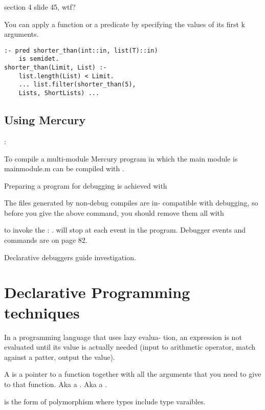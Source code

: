 \begin{compactitem}
\item section 4 slide 45, wtf?

\item You can  apply a function or a predicate by specifying the values of its first k arguments.
\begin{lstlisting}
:- pred shorter_than(int::in, list(T)::in)
    is semidet.
shorter_than(Limit, List) :-
    list.length(List) < Limit.
    ... list.filter(shorter_than(5),
    Lists, ShortLists) ...
\end{lstlisting}

\subsection{Using Mercury}
\item {}: 
\item To compile a multi-module Mercury program in which the main module is mainmodule.m can be compiled with .
\item Preparing a program for debugging is achieved with 
\item The files generated by non-debug compiles are in-
compatible with debugging, so before you give the
above command, you should remove them all with
\item to invoke the : .  will stop at each event in the program. Debugger events and commands are on page 82.
\item Declarative debuggers guide investigation. 


\section{Declarative Programming techniques}
\item In a programming language that uses lazy evalua-
tion, an expression is not evaluated until its value
is actually needed (input to arithmetic operator, match against a patter, output the value).

\item A  is a pointer to a function together with all the arguments that you need to give to that function. Aka a . Aka a . 

\item {} is the form of polymorphism where types include type varaibles.


\end{compactitem}
